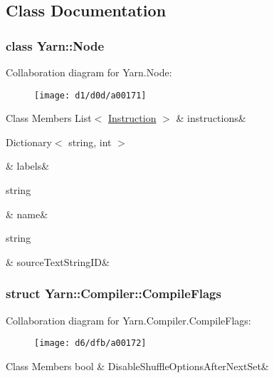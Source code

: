 \subsection{Class Documentation}
\label{dd/dae/a00163}
\hypertarget{a00026_dd/dae/a00163}{}
\subsubsection{class Yarn\-:\-:Node}


Collaboration diagram for Yarn.\-Node\-:
\nopagebreak
\begin{figure}[H]
\begin{center}
\leavevmode
\texttt{[image: d1/d0d/a00171]}
\end{center}
\end{figure}
\begin{DoxyFields}{Class Members}
\hypertarget{a00026_a156723a9252b62d288ddf611939ea7c3}{List$<$ \hyperlink{a00044}{Instruction} $>$}\label{a00026_a156723a9252b62d288ddf611939ea7c3}
&
instructions&
\\
\hline

\hypertarget{a00026_a9afa49f4fbc72e806a0210cb4198f12e}{Dictionary$<$ string, int $>$}\label{a00026_a9afa49f4fbc72e806a0210cb4198f12e}
&
labels&
\\
\hline

\hypertarget{a00026_a107b0de3fcfc65e99913edc01b5ce9db}{string}\label{a00026_a107b0de3fcfc65e99913edc01b5ce9db}
&
name&
\\
\hline

\hypertarget{a00026_a09c6af5b50925d0876283b84281b3ed4}{string}\label{a00026_a09c6af5b50925d0876283b84281b3ed4}
&
source\-Text\-String\-I\-D&
\\
\hline

\end{DoxyFields}
\label{de/d38/a00160}
\hypertarget{a00029_de/d38/a00160}{}
\subsubsection{struct Yarn\-:\-:Compiler\-:\-:Compile\-Flags}


Collaboration diagram for Yarn.\-Compiler.\-Compile\-Flags\-:
\nopagebreak
\begin{figure}[H]
\begin{center}
\leavevmode
\texttt{[image: d6/dfb/a00172]}
\end{center}
\end{figure}
\begin{DoxyFields}{Class Members}
\hypertarget{a00029_a8b49bb7763ff477cba21d7c771ef3ed0}{bool}\label{a00029_a8b49bb7763ff477cba21d7c771ef3ed0}
&
Disable\-Shuffle\-Options\-After\-Next\-Set&
\\
\hline

\end{DoxyFields}
